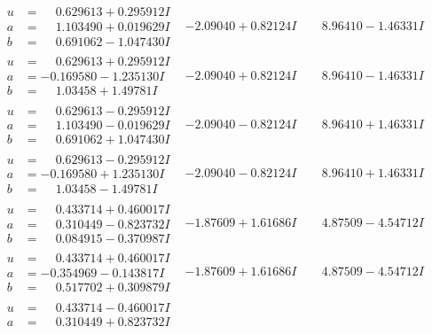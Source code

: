 \documentclass[1p]{elsarticle_modified}
\theoremstyle{definition}
\begin{document}
$$\begin{array}{c|c|c}
\begin{aligned}
u &= \phantom{-}0.629613 + 0.295912 I \\
a &= \phantom{-}1.103490 + 0.019629 I \\
b &= \phantom{-}0.691062 - 1.047430 I\end{aligned}
 & -2.09040 + 0.82124 I & \phantom{-}8.96410 - 1.46331 I \\ \hline\begin{aligned}
u &= \phantom{-}0.629613 + 0.295912 I \\
a &= -0.169580 - 1.235130 I \\
b &= \phantom{-}1.03458 + 1.49781 I\end{aligned}
 & -2.09040 + 0.82124 I & \phantom{-}8.96410 - 1.46331 I \\ \hline\begin{aligned}
u &= \phantom{-}0.629613 - 0.295912 I \\
a &= \phantom{-}1.103490 - 0.019629 I \\
b &= \phantom{-}0.691062 + 1.047430 I\end{aligned}
 & -2.09040 - 0.82124 I & \phantom{-}8.96410 + 1.46331 I \\ \hline\begin{aligned}
u &= \phantom{-}0.629613 - 0.295912 I \\
a &= -0.169580 + 1.235130 I \\
b &= \phantom{-}1.03458 - 1.49781 I\end{aligned}
 & -2.09040 - 0.82124 I & \phantom{-}8.96410 + 1.46331 I \\ \hline\begin{aligned}
u &= \phantom{-}0.433714 + 0.460017 I \\
a &= \phantom{-}0.310449 - 0.823732 I \\
b &= \phantom{-}0.084915 - 0.370987 I\end{aligned}
 & -1.87609 + 1.61686 I & \phantom{-}4.87509 - 4.54712 I \\ \hline\begin{aligned}
u &= \phantom{-}0.433714 + 0.460017 I \\
a &= -0.354969 - 0.143817 I \\
b &= \phantom{-}0.517702 + 0.309879 I\end{aligned}
 & -1.87609 + 1.61686 I & \phantom{-}4.87509 - 4.54712 I \\ \hline\begin{aligned}
u &= \phantom{-}0.433714 - 0.460017 I \\
a &= \phantom{-}0.310449 + 0.823732 I \\

\end{aligned}
\end{array}$$
\end{document}
